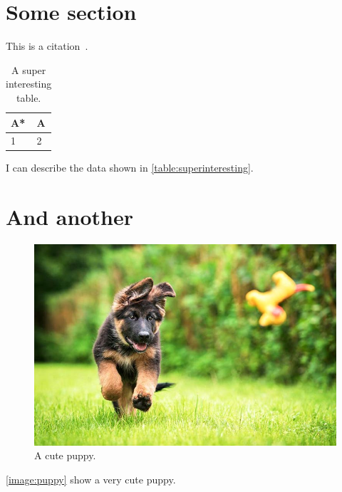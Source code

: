 \section{Some section}
\label{chap:introduction:somesec}

This is a citation~\cite{smalley2001implementing}.

\begin{table}[h]
	\centering
	\begin{tabular}{|l|l|}
		A* & A \\
		\hline
		1  & 2
	\end{tabular}
	\caption{A super interesting table.}
	\label{table:superinteresting}
\end{table}

I can describe the data shown in \autoref{table:superinteresting}.

\section{And another}
\label{chap:introduction:another}

\begin{figure}[h]
	\centering
	\includegraphics[width=\textwidth]{./img/puppy.jpg}
	\caption{A cute puppy.}
	\label{image:puppy}
\end{figure}

\autoref{image:puppy} show a very cute puppy.


